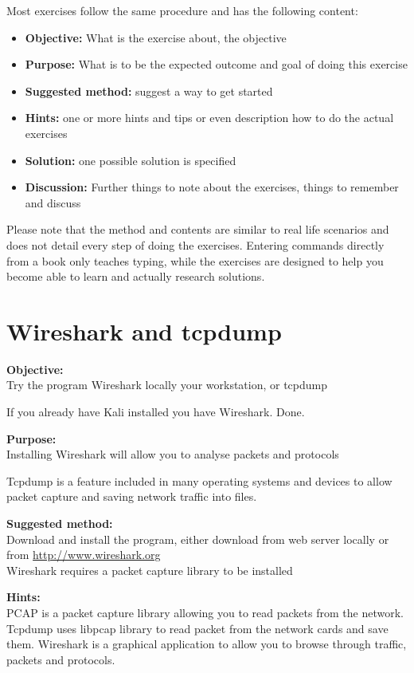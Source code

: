 \documentclass[a4paper,11pt,notitlepage]{report}
\begin{document}
Most exercises follow the same procedure and has the following content:
\begin{itemize}
\item {\bf Objective:} What is the exercise about, the objective
\item {\bf Purpose:} What is to be the expected outcome and goal of doing this exercise
\item {\bf Suggested method:} suggest a way to get started
\item {\bf Hints:} one or more hints and tips or even description how to
do the actual exercises
\item {\bf Solution:} one possible solution is specified
\item {\bf Discussion:} Further things to note about the exercises, things to remember and discuss
\end{itemize}

Please note that the method and contents are similar to real life scenarios and does not detail every step of doing the exercises. Entering commands directly from a book only teaches typing, while the exercises are designed to help you become able to learn and actually research solutions.



\chapter{Wireshark and tcpdump}
\label{ex:wireshark-install}



{\bf Objective:}\\
Try the program Wireshark locally your workstation, or tcpdump

If you already have Kali installed you have Wireshark. Done.

{\bf Purpose:}\\
Installing Wireshark will allow you to analyse packets and protocols

Tcpdump is a feature included in many operating systems and devices to allow packet capture and saving network traffic into files.

{\bf Suggested method:}\\
Download and install the program, either download from web server locally or from \url{http://www.wireshark.org}\\
Wireshark requires a packet capture library to be installed

{\bf Hints:}\\
PCAP is a packet capture library allowing you to read packets from the network.
Tcpdump uses libpcap library to read packet from the network cards and save them.
Wireshark is a graphical application to allow you to browse through traffic, packets and protocols.
\end{document}
